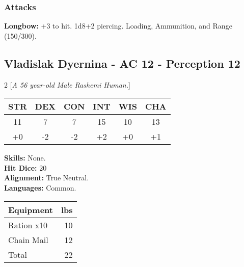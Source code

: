 \subsubsection*{Attacks}
\textbf{Longbow:} +3 to hit. 1d8+2 piercing. Loading, Ammunition, and Range (150/300).\\
\subsection*{Vladislak Dyernina - AC 12 - Perception 12}
\begin{multicols}{2}
[\textit{A 56 year-old Male Rashemi Human.}]
\begin{tabular}{cccccc}
 {STR}&
 {DEX}&
 {CON}&
 {INT}&
 {WIS}&
 {CHA}\\
\hline
11 & 7 & 7 & 15 & 10 & 13\\
+0 & -2 & -2 & +2 & +0 & +1
\end{tabular}
\textbf{Skills:} 
None.\\
\textbf{Hit Dice:} 20\\
\textbf{Alignment:} True Neutral.\\
\textbf{Languages:} 
Common.\\

\begin{tabular}{p{} r}
\textbf{Equipment} & lbs\\
\hline

Ration x10 & 10\\

Chain Mail & 12\\

\hline
Total & 22
\end{tabular}


\end{multicols}


